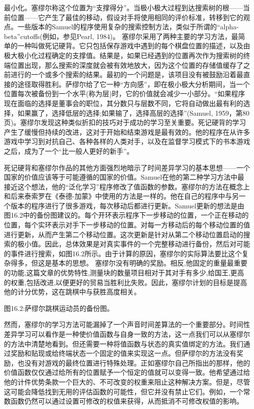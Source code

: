 最小化。塞缪尔称这个位置为“支撑得分”。当极小极大过程到达搜索树的根——当前位置——它产生了最佳的移动，假设对手将使用相同的评价标准，转移到它的观点。一些版本的Samuel的程序使用复杂的搜索控制方法，类似于所谓的“alpha-beta”cutoffs(例如，参见Pearl, 1984)。
塞缪尔采用了两种主要的学习方法，最简单的一种叫做死记硬背。它只包括保存游戏中遇到的每个棋盘位置的描述，以及由极大极小化过程确定的支撑值。结果是，如果已经遇到的位置再次作为搜索树的终端位置出现，那么搜索的深度就会被有效地放大，因为这个位置的存储值缓存了之前进行的一个或多个搜索的结果。最初的一个问题是，该项目没有被鼓励沿着最直接的途径取得胜利。萨缪尔给了它一种“方向感”，即在极小极大分析期间，当一个位置每次被备份到一个水平(称为层)时，它的价值就会减少一小部分。“如果程序现在面临的选择是董事会的职位，其分数只与层数不同，它将自动做出最有利的选择，如果赢了，选择低层的选择;如果输了，选择高层的选择”(Samuel, 1959，第80页)。塞缪尔发现这种类似折扣的技巧对于成功的学习至关重要。死记硬背的学习产生了缓慢但持续的改进，这对于开始和结束游戏是最有效的。他的程序在从许多游戏中学习到对抗自己、各种各样的人类对手，以及在监督学习模式下的书本游戏之后，成为了一个“比一般人更好的新手”。

死记硬背和塞缪尔作品的其他方面强烈地暗示了时间差异学习的基本思想——一个国家的价值应该等于可能遵循的国家的价值。Samuel在他的第二种学习方法中最接近这个想法，他的“泛化学习”程序修改了值函数的参数。塞缪尔的方法在概念上和后来泰索罗在《泰德-加蒙》中使用的方法是一样的。他在自己的程序中与另一个版本的程序进行了很多游戏，每次移动后都进行更新。Samuel更新的想法是由图16.2中的备份图建议的。每个开环表示程序下一步移动的位置，一个正在移动的位置，每个实环表示对手下一步移动的位置。对每一方移动后的每个移动位置的值进行更新，从而产生第二个移动位置。这次更新是针对从第二个移动位置启动的搜索的极小值。因此，总体效果是对真实事件的一个完整移动进行备份，然后对可能的事件进行搜索，如图16.2所示。由于计算的原因，塞缪尔的实际算法要比这个复杂得多，但这是基本的思想。
塞缪尔没有明确的奖励。相反,他固定的重量最重要的功能,这篇文章的优势特性,测量块的数量项目相对于其对手有多少,给国王,更高的权重,包括改进,以便更好的贸易当胜利比失败。因此，塞缪尔计划的目标是提高他的计分优势，这在跳棋中与获胜高度相关。

图16.2:萨缪尔跳棋运动员的备份图。

然而，塞缪尔的学习方法可能漏掉了一个声音时间差算法的一个重要部分。时间性差异学习可以看作是一种使价值函数与自身一致的方法，这一点我们可以从塞缪尔的方法中清楚地看到。但还需要一种将值函数与状态的真实值绑定的方法。我们通过奖励和贴现或给终端状态一个固定的值来实现这一点。但萨缪尔的方法没有奖励，也没有对游戏的最终位置进行特殊处理。正如塞缪尔自己所指出的那样，他的价值函数仅仅通过给所有的位置赋予一个恒定的值就可以变得一致。他希望通过给他的计件优势条款一个巨大的、不可改变的权重来阻止这种解决方案。但是，尽管这可能会降低找到无用的评估函数的可能性，但它并没有禁止它们。例如，一个常数函数仍然可以通过设置可修改的权值来获得，从而抵消不可修改权值的影响。

